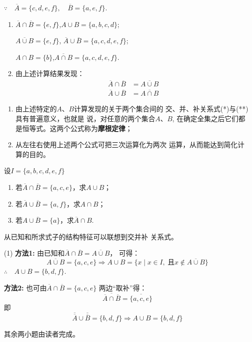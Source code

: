 \begin{solution}
    $\because\quad \overline{A}=\{c,d,e,f\},\quad \overline{B}=\{a,e, f\}$.
\begin{enumerate}[(1)]
    \item $\overline{A}\cap \overline{B}=\{e, f\}$,\quad  $A\cup B=\{a,b,c,d\}$;
    
 $\overline{A\cup B}=\{e,f\}$, \quad $\overline{A}\cup\overline{B}=\{a,c,d,e,f\}$;

$A\cap B=\{b\}$,\quad  $\overline{A\cap B}=\{a,c,d,e,f\}$.

\item 由上述计算结果发现：
\begin{align}
    \overline{A}\cap\overline{B}&=\overline{A\cup B}\tag{*}\\
    \overline{A}\cup\overline{B}&=\overline{A\cap B}\tag{**}
\end{align}
\end{enumerate}

\end{solution}

\begin{note}
\begin{enumerate}
    \item 由上述特定的$A$、$B$计算发现的关于两个集合间的
    交、并、补关系式(*)与(**)具有普遍意义，也就是
    说，对任意的两个集合$A$、$B$, 在确定全集之后它们都是恒等式。这两个公式称为\textbf{摩根定律}；
    \item 从左往右使用上述两个公式可把三次运算化为两次
    运算，从而能达到简化计算的目的。
\end{enumerate}
\end{note}

\begin{example}
设$I=\{a,b,c,d,e,f\}$
\begin{enumerate}[(1)]
    \item 若$\overline{A}\cap \overline{B}=\{a,c,e\}$，求$A\cup B$；
    \item 若$\overline{A}\cup \overline{B}=\{a,f\}$，求$A\cap B$；
    \item 若${A}\cup \overline{B}=\{a\}$，求$\overline{A}\cap B$.
\end{enumerate}
\end{example}

\begin{analyze}
    从已知和所求式子的结构特征可以联想到交并补
关系式。
\end{analyze}

\begin{solution}
(1) \textbf{方法1:} 由已知和$\overline{A}\cap\overline{B}=\overline{A\cup B}$，
可得：
\[\overline{A\cup B}=\{a,c,e\}\Longrightarrow A\cup B=\{x\mid x\in I,\; \text{且}x\notin \overline{A\cup B}\}\]
$\therefore\quad A\cup B=\{b,d,f\}$.

\textbf{方法2:} 也可由$\overline{A}\cap \overline{B}=\{a,c,e\}$
两边“取补”得：
\[\overline{\overline{A}\cap \overline{B}} =\overline{\{a,c,e\}}\]
即
\[\overline{\overline{A}}\cup \overline{\overline{B}}=\{b,d,
f\}\Longrightarrow A\cup B=\{b,d,f\}\]

其余两小题由读者完成。    
\end{solution}


